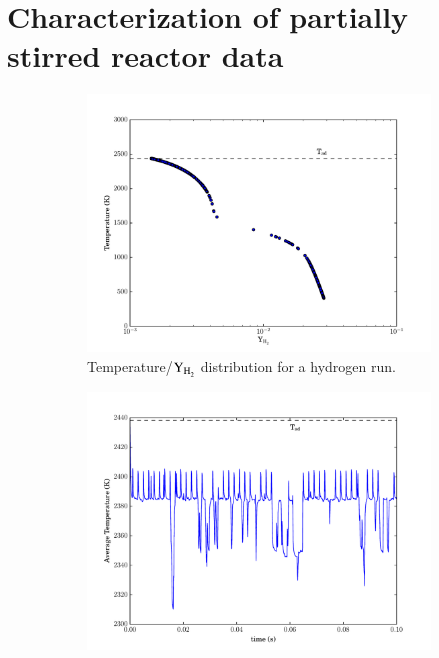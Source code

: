 \documentclass[preprint,review,11pt]{elsarticle}
\begin{document}
\clearpage

\section{Characterization of partially stirred reactor data}

\label{S:pasr_charac}
\begin{figure}[htbp]
  \centering
  \begin{subfigure}{0.49\textwidth}
      \includegraphics[width=\linewidth]{H2_pasr_dist.pdf}
      \caption{Temperature\slash $\text{Y}_{\text{\ce{H2}}}$ distribution for a hydrogen run.}
  \end{subfigure}
  \begin{subfigure}{0.49\textwidth}
      \includegraphics[width=\linewidth]{H2_pasr_tbar.pdf}

\end{subfigure}
\end{figure}
\end{document}
